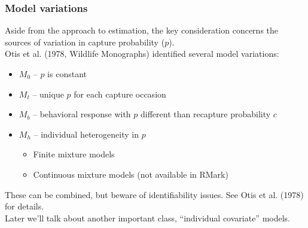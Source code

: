 \documentclass[color=usenames,dvipsnames]{beamer}\usepackage[]{graphicx}\usepackage[]{color}
\begin{document}
\begin{frame}
  \frametitle{Model variations}
  \small
  Aside from the approach to estimation, the key consideration
  concerns the sources of variation in capture probability ($p$). \\
  \pause
  \vfill
  Otis et al. (1978, Wildlife Monographs) identified several model
  variations: 
  \begin{itemize}
    \small
    \item $M_0$ -- $p$ is constant
    \item $M_t$ -- unique $p$ for each capture occasion
    \item \hangindent=0.8cm $M_b$ -- behavioral response with $p$ different than
      recapture probability $c$
    \item $M_h$ -- individual heterogeneity in $p$
      \begin{itemize}
        \item Finite mixture models
        \item Continuous mixture models (not available in RMark)
      \end{itemize}
  \end{itemize}
  \pause \vfill
  These can be combined, but beware of identifiability issues. See
  Otis et al. (1978) for details.  \\
  \pause \vfill
  Later we'll talk about another important class, 
  ``individual covariate'' models.  
\end{frame}
\end{document}
